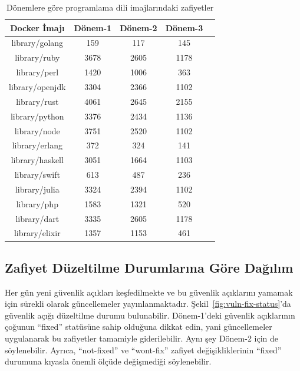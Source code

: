 \begin{table}
    \caption{Dönemlere göre programlama dili imajlarındaki zafiyetler}\label{tab:proglang-by-periods}
    \centering
    \begin{tabular}{ |c|c|c|c|c| }
        \hline
        Docker İmajı & Dönem-1 & Dönem-2 & Dönem-3 \\
        \hline
        library/golang  &  159 &  117 &  145 \\
        library/ruby    & 3678 & 2605 & 1178 \\
        library/perl    & 1420 & 1006 &  363 \\
        library/openjdk & 3304 & 2366 & 1102 \\
        library/rust    & 4061 & 2645 & 2155 \\
        library/python  & 3376 & 2434 & 1136 \\
        library/node    & 3751 & 2520 & 1102 \\
        library/erlang  &  372 &  324 &  141 \\
        library/haskell & 3051 & 1664 & 1103 \\
        library/swift   &  613 &  487 &  236 \\
        library/julia   & 3324 & 2394 & 1102 \\
        library/php     & 1583 & 1321 &  520 \\
        library/dart    & 3335 & 2605 & 1178 \\
        library/elixir  & 1357 & 1153 &  461 \\
        \hline
    \end{tabular}
\end{table}

\subsection{Zafiyet Düzeltilme Durumlarına Göre Dağılım}\label{subsec:fix-status}

Her gün yeni güvenlik açıkları keşfedilmekte ve bu güvenlik açıklarını yamamak için sürekli olarak güncellemeler yayınlanmaktadır. Şekil~\ref{fig:vuln-fix-status}'da güvenlik açığı düzeltilme durumu bulunabilir. Dönem-1'deki güvenlik açıklarının çoğunun ``fixed'' statüsüne sahip olduğuna dikkat edin, yani güncellemeler uygulanarak bu zafiyetler tamamiyle giderilebilir. Aynı şey Dönem-2 için de söylenebilir. Ayrıca, ``not-fixed'' ve ``wont-fix'' zafiyet değişikliklerinin ``fixed'' durumuna kıyasla önemli ölçüde değişmediği söylenebilir.


